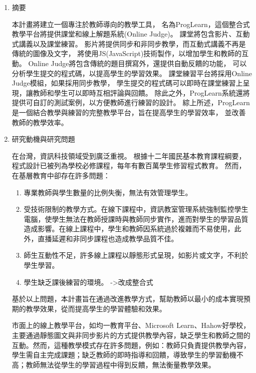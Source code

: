 \documentclass[12pt]{article}
\begin{document}
\date{}
\usetikzlibrary{automata, positioning, arrows}
{}

\begin{enumerate}
  \setlength{\parindent}{2em}
  \item 摘要 
    \par 本計畫將建立一個專注於教師導向的教學工具，
    名為ProgLearn，這個整合式教學平台將提供課堂和線上解題系統(Online Judge)。
    課堂將包含影片、互動式講義以及課堂練習。
    影片將提供同步和非同步教學，而互動式講義不再是傳統的圖像及文字，
    將使用JS(JavaScript)技術製作，以增加學生和教師的互動。
    Online Judge將包含傳統的題目撰寫外，還提供自動反饋的功能，
    可以分析學生提交的程式碼，以提高學生的學習效果。
    課堂練習平台將採用Online Judge模組，如果採用同步教學，
    學生提交的程式碼可以即時在課堂練習上呈現，讓教師和學生可以即時互相評論與回饋。
    除此之外，ProgLearn系統還將提供可自訂的測試案例，以方便教師進行練習的設計。
    綜上所述，ProgLearn是一個結合教學與練習的完整教學平台，旨在提高學生的學習效率，
    並改善教師的教學效率。
  \item 研究動機與研究問題
    \par 在台灣，資訊科技領域受到廣泛重視。
    根據十二年國民基本教育課程綱要\cite{ref1}，
    程式設計已被列為學校必修課程，每年有數百萬學生修習程式教育。
    然而，在基層教育中卻存在許多問題：
    \begin{enumerate}
      \item 專業教師與學生數量的比例失衡，無法有效管理學生。\cite{ref2}
      \item 受技術限制的教學方式。在線下課程中，資訊教室管理系統\cite{ref3}強制監控學生電腦，使學生無法在教師授課時與教師同步實作，進而對學生的學習品質造成影響。在線上課程中，學生和教師因系統過於複雜而不易使用，此外，直播延遲和非同步課程也造成教學品質不佳。
      \item 師生互動性不足，許多線上課程以靜態形式呈現，如影片或文字，不利於學生學習。
      \item 學生缺乏課後練習的環境。 ->改成整合式
    \end{enumerate}
    \par 基於以上問題，本計畫旨在通過改進教學方式，幫助教師以最小的成本實現預期的教學效果，從而提高學生的學習體驗和效果。
    \par 市面上的線上教學平台，如均一教育平台、Microsoft Learn、Hahow好學校，主要通過靜態圖文與非同步影片的方式提供教學內容，缺乏學生和教師之間的互動。然而，這種教學模式存在許多問題，例如：教師只負責提供教學內容，學生需自主完成課題；缺乏教師的即時指導和回饋，導致學生的學習動機不高；教師無法從學生的學習過程中得到反饋，無法衡量教學效果。

\end{enumerate}
\end{document}
